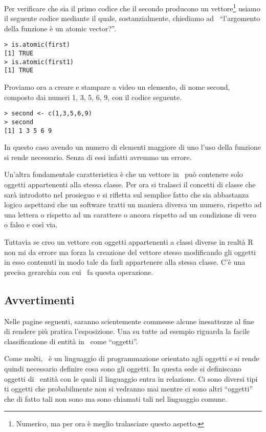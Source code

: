 Per verificare che sia il primo codice che il secondo producono un vettore\footnote{Numerico, ma per ora è meglio tralasciare questo aspetto.} usiamo il seguente codice mediante il quale, sostanzialmente, chiediamo ad \erre\  ``l'argomento della funzione  è un atomic vector?''.
\begin{lstlisting}
> is.atomic(first)
[1] TRUE
> is.atomic(first1)
[1] TRUE
\end{lstlisting}

Proviamo ora a creare e stampare a video un elemento, di nome second, composto dai numeri 1, 3, 5, 6, 9, con il codice seguente.
\begin{lstlisting}
> second <- c(1,3,5,6,9)
> second
[1] 1 3 5 6 9
\end{lstlisting}

In questo caso avendo un numero di elementi maggiore di uno l'uso della funzione  si rende necessario. Senza di essi infatti avremmo un errore.

Un'altra fondamentale caratteristica è che un vettore in \erre\ può contenere solo oggetti appartenenti alla stessa classe. Per ora si tralasci il concetti di classe che sarà introdotto nel prosieguo e si rifletta sul semplice fatto che sia abbastanza logico aspettarsi che un software tratti un maniera diversa un numero, rispetto ad una lettera o rispetto ad un carattere o ancora rispetto ad un condizione di vero o falso e così via.

Tuttavia se creo un vettore con oggetti appartenenti a classi diverse in realtà R non mi da errore ma forza la creazione del vettore stesso modificando gli oggetti in esso contenuti in modo tale da farli appartenere alla stessa classe. C’è una precisa gerarchia con cui \erre\ fa questa operazione.

\subsection{Avvertimenti}
Nelle pagine seguenti, saranno scientemente commesse alcune inesattezze al fine di rendere più pratica l'esposizione. Una su tutte ad esempio riguarda la facile classificazione di entità in \erre\ come ``oggetti''.

Come molti, \erre\ è un linguaggio di programmazione orientato agli oggetti e si rende quindi necessario definire cosa sono gli oggetti. In questa sede si definiscano oggetti di \erre\ entità con le quali il linguaggio entra in relazione. Ci sono diversi tipi ti oggetti che probabilmente non si vedranno mai mentre ci sono altri ``oggetti'' che di fatto tali non sono ma sono chiamati tali nel linguaggio comune.

